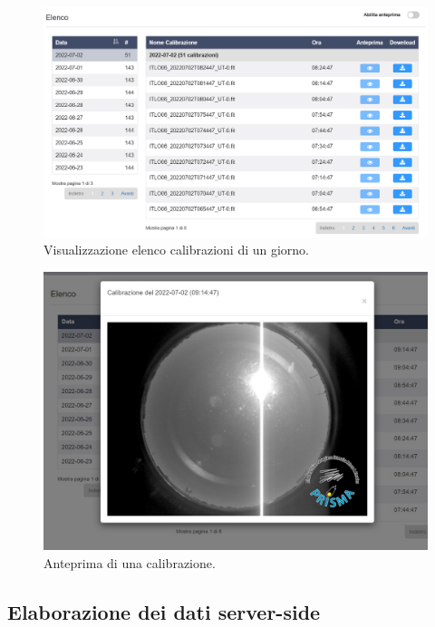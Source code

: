 \begin{figure}[H]
    \begin{center}
    \includegraphics[width=\textwidth]{images/captures-table.png}
    \caption{Visualizzazione elenco calibrazioni di un giorno.}
    \label{fig:capture-table}
    \end{center}
\end{figure}
\vspace{-24pt}
\begin{figure}[H]
    \begin{center}
    \includegraphics[width=\textwidth]{images/capture-preview.jpg}
    \caption{Anteprima di una calibrazione.}
    \label{fig:capture-preview}
    \end{center}
    
\end{figure}

\subsection{Elaborazione dei dati server-side} \label{elaborazione-dati-capture}

